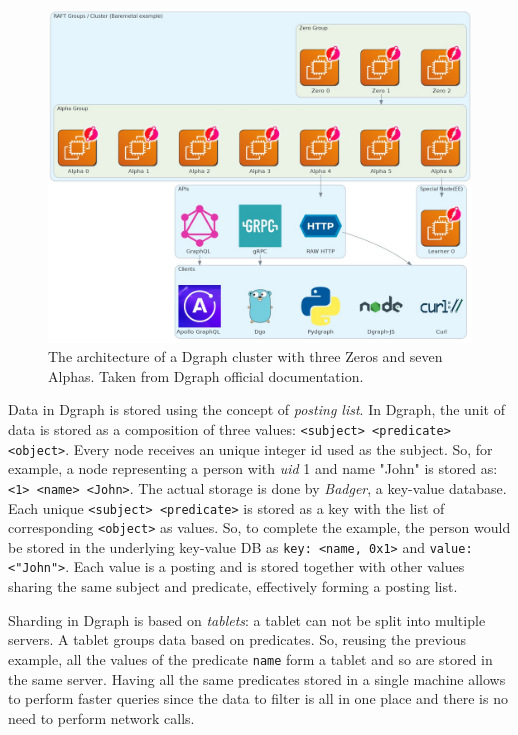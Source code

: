 \begin{figure}
    \centering
    \includegraphics[width=1\textwidth]{Figures/background/dgraph-architecture.jpg}
    \caption{The architecture of a Dgraph cluster with three Zeros and seven Alphas. Taken from Dgraph official documentation.}
    \label{fig:dgraph-architecture}
\end{figure}

Data in Dgraph is stored using the concept of \textit{posting list}. In Dgraph, the unit of data is stored as a composition of three values: \lstinline{<subject> <predicate> <object>}. Every node receives an unique integer id used as the subject. So, for example, a node representing a person with \textit{uid} 1 and name "John" is stored as: \lstinline{<1> <name> <John>}. The actual storage is done by \textit{Badger}, a key-value database. Each unique \lstinline{<subject> <predicate>} is stored as a key with the list of corresponding \lstinline{<object>} as values. So, to complete the example, the person would be stored in the underlying key-value DB as \lstinline{key: <name, 0x1>} and \lstinline{value: <"John">}. Each value is a posting and is stored together with other values sharing the same subject and predicate, effectively forming a posting list.

Sharding in Dgraph is based on \textit{tablets}: a tablet can not be split into multiple servers. A tablet groups data based on predicates. So, reusing the previous example, all the values of the predicate \lstinline{name} form a tablet and so are stored in the same server. Having all the same predicates stored in a single machine allows to perform faster queries since the data to filter is all in one place and there is no need to perform network calls.

